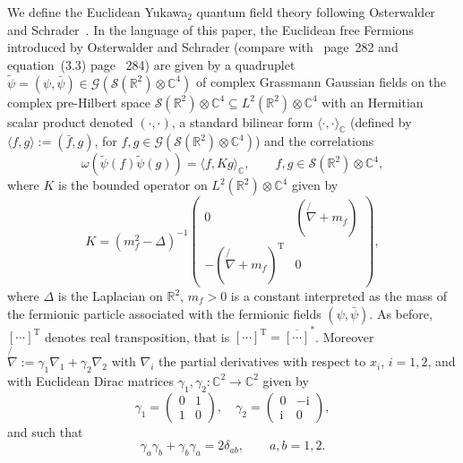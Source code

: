 \documentclass{article}
\newcommand{\Tau}{\mathrm{T}}
\newcommand{\assign}{:=}
\newcommand{\mathi}{\mathrm{i}}
\begin{document}
We define the Euclidean Yukawa$_2$ quantum field theory following Osterwalder
and Schrader~{\cite{osterwalder_euclidean_1973-2}}. In the language of this
paper, the Euclidean free Fermions introduced by Osterwalder and Schrader
(compare with~{\cite{osterwalder_euclidean_1973-2}} page~282 and
equation~(3.3) page ~284) are given by a quadruplet $\tilde{\psi} = (\psi,
\bar{\psi}) \in \mathcal{G} (\mathcal{S} (\mathbb{R}^2) \otimes \mathbb{C}^4)$
of complex Grassmann Gaussian fields on the complex pre-Hilbert space
$\mathcal{S} (\mathbb{R}^2) \otimes \mathbb{C}^4 \subseteq L^2 (\mathbb{R}^2)
\otimes \mathbb{C}^4$ with an Hermitian scalar product denoted $(\cdot,
\cdot)$, a standard bilinear form $\langle \cdot, \cdot \rangle_{\mathbb{C}}$
(defined by $\langle f, g \rangle \assign (\bar{f}, g)$, for $f, g \in
\mathcal{G} (\mathcal{S} (\mathbb{R}^2) \otimes \mathbb{C}^4)$) and the
correlations
\begin{equation}
  \omega (\tilde{\psi} (f) \tilde{\psi} (g)) = \langle f, K g
  \rangle_{\mathbb{C}}, \label{eq:free-corrrelation} \qquad f, g \in
  \mathcal{S} (\mathbb{R}^2) \otimes \mathbb{C}^4,
\end{equation}
where $K$ is the bounded operator on $L^2 (\mathbb{R}^2) \otimes \mathbb{C}^4$
given by
\[ K = (m_f^2 - \Delta)^{- 1} \left(\begin{array}{cc}
     0 & \left( \not{\nabla} + m_f \right)\\
     - \left( \not{\nabla} + m_f \right)^{\Tau} & 0
   \end{array}\right), \]
where $\Delta$ is the Laplacian on $\mathbb{R}^2$, $m_f > 0$ is a constant
interpreted as the mass of the fermionic particle associated with the
fermionic fields $(\psi, \bar{\psi})$. As before, $[\cdots]^{\Tau}$ denotes
real transposition, that is $[\cdots]^{\Tau} = \overline{[\cdots]}^{\ast}$.
Moreover $\not{\nabla} \assign \gamma_1 \nabla_1 + \gamma_2 \nabla_2$ with
$\nabla_i$ the partial derivatives with respect to $x_i$, $i = 1, 2$, and with
Euclidean Dirac matrices $\gamma_1, \gamma_2 : \mathbb{C}^2 \rightarrow
\mathbb{C}^2$ given by
\[ \gamma_1 = \left(\begin{array}{cc}
     0 & 1\\
     1 & 0
   \end{array}\right), \quad \gamma_2 = \left(\begin{array}{cc}
     0 & - \mathi\\
     \mathi & 0
   \end{array}\right), \]
and such that
\[ \gamma_a \gamma_b + \gamma_b \gamma_a = 2 \delta_{a b}, \qquad a, b = 1, 2.
\]
\end{document}
